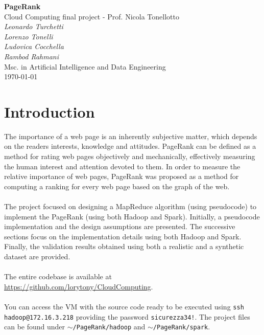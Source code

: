 \documentclass[11pt,a4paper]{article}
\begin{document}
\begin{center}
	\Large\textbf{PageRank}\\
	\vspace{0.2cm}
	\large{Cloud Computing final project - Prof. Nicola Tonellotto}\\
	\vspace{1.0cm}
	\large\textit{Leonardo Turchetti}\\
	\large\textit{Lorenzo Tonelli}\\
	\large\textit{Ludovica Cocchella}\\
	\large\textit{Rambod Rahmani}\\
	\vspace{0.2cm}
	\normalsize{Msc. in Artificial Intelligence and Data Engineering}\\
	\vspace{1.0cm}
	\today
\end{center}
\vspace{1cm}
\tableofcontents
\vspace{1cm}
\section{Introduction}
The importance of a web page is an inherently subjective matter, which depends on the readers interests, knowledge and attitudes. PageRank can be defined as a method for rating web pages objectively and mechanically, effectively measuring the human interest and attention devoted to them. In order to measure the relative importance of web pages, PageRank was proposed as a method for computing a ranking for every web page based on the graph of the web.\\
\\
The project focused on designing a MapReduce algorithm (using pseudocode) to implement the PageRank (using both Hadoop and Spark). Initially, a pseudocode implementation and the design assumptions are presented. The successive sections focus on the implementation details using both Hadoop and Spark. Finally, the validation results obtained using both a realistic and a synthetic dataset are provided.\\
\\
The entire codebase is available at \url{https://github.com/lorytony/CloudComputing}.\\
\\
You can access the VM with the source code ready to be executed using \texttt{ssh hadoop@172.16.3.218} providing the password \texttt{sicurezza34!}. The project files can be found under \texttt{$\sim$/PageRank/hadoop} and \texttt{$\sim$/PageRank/spark}.
\end{document}
